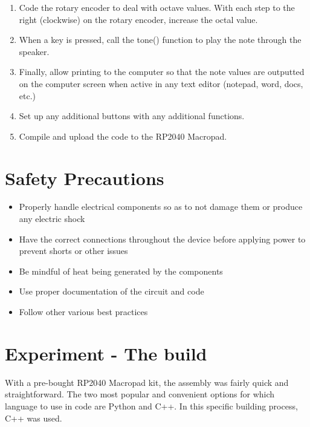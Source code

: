 \documentclass{article}
\begin{document}
\begin{enumerate}
    \item Code the rotary encoder to deal with octave values. With each step to the right (clockwise) on the rotary encoder, increase the octal value.
    
    \item When a key is pressed, call the tone() function to play the note through the speaker. 

    \item Finally, allow printing to the computer so that the note values are outputted on the computer screen when active in any text editor (notepad, word, docs, etc.)

    \item Set up any additional buttons with any additional functions. 

    \item Compile and upload the code to the RP2040 Macropad. 
        
   
\end{enumerate}

\section{Safety Precautions}
\begin{itemize}
    \item Properly handle electrical components so as to not damage them or produce any electric shock
    \item Have the correct connections throughout the device before applying power to prevent shorts or other issues
    \item Be mindful of heat being generated by the components
    \item Use proper documentation of the circuit and code
    \item Follow other various best practices
\end{itemize}

\section{Experiment - The build}

\hspace{1cm} With a pre-bought RP2040 Macropad kit, the assembly was fairly quick and straightforward. The two most popular and convenient options for which language to use in code are Python and C++. In this specific building process, C++ was used.\\\\
\end{document}
